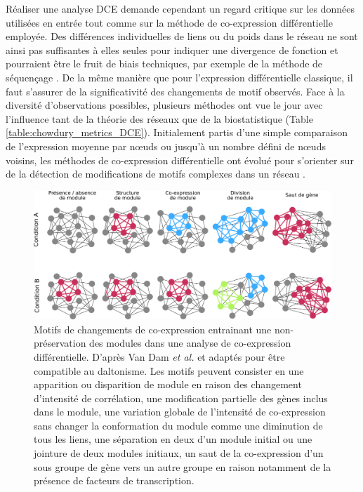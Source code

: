 Réaliser une analyse DCE demande cependant un regard critique sur les données utilisées en entrée tout comme sur la méthode de co-expression différentielle employée. Des différences individuelles de liens ou du poids dans le réseau ne sont ainsi pas suffisantes à elles seules pour indiquer une divergence de fonction et pourraient être le fruit de biais techniques, par exemple de la méthode de séquençage \cite{Southworth2009}. De la même manière que pour l'expression différentielle classique, il faut s'assurer de la significativité des changements de motif observés. Face à la diversité d'observations possibles, plusieurs méthodes ont vue le jour avec l'influence tant de la théorie des réseaux que de la biostatistique (Table \ref{table:chowdury_metrics_DCE}). Initialement partis d'une simple comparaison de l'expression moyenne par nœuds ou jusqu'à un nombre défini de nœuds voisins, les méthodes de co-expression différentielle ont évolué pour s'orienter sur de la détection de modifications de motifs complexes dans un réseau \cite{delaFuente2010Jul}. 

\begin{figure}[ht]
    \centering
    \includegraphics[width=\textwidth]{img/intro/3_coexpr/intro_3_coexpr_codiff.pdf}
    \caption[Motifs de changements de co-expression entrainant une non-préservation des modules dans une analyse de co-expression différentielle]{Motifs de changements de co-expression entrainant une non-préservation des modules dans une analyse de co-expression différentielle. D'après Van Dam \textit{et al.} \cite{VanDam2018} et adaptés pour être compatible au daltonisme. Les motifs peuvent consister en une apparition ou disparition de module en raison des changement d'intensité de corrélation, une modification partielle des gènes inclus dans le module, une variation globale de l'intensité de co-expression sans changer la conformation du module comme une diminution de tous les liens, une séparation en deux d'un module initial ou une jointure de deux modules initiaux, un saut de la co-expression d'un sous groupe de gène vers un autre groupe en raison notamment de la présence de facteurs de transcription.}
    \label{fig:differential_coexpression_patterns}
\end{figure}


